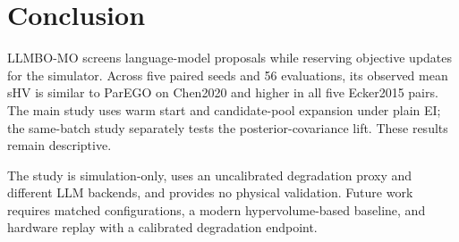 \section{Conclusion}
\label{sec:conclusion}

LLMBO-MO screens language-model proposals while reserving objective updates for
the simulator. Across five paired seeds and 56 evaluations, its observed mean
sHV is similar to ParEGO on Chen2020 and higher in all five Ecker2015 pairs.
The main study uses warm start and candidate-pool expansion under plain EI;
the same-batch study separately tests the posterior-covariance lift. These
results remain descriptive.

The study is simulation-only, uses an uncalibrated degradation proxy and
different LLM backends, and provides no physical validation. Future work
requires matched configurations, a modern hypervolume-based baseline, and
hardware replay with a calibrated degradation endpoint.
